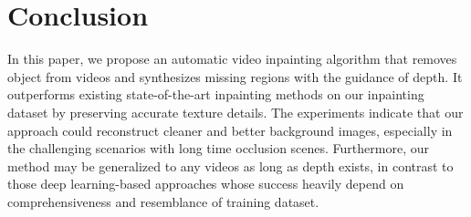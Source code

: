 \documentclass[runningheads]{llncs}
\begin{document}
%
 
\section{Conclusion}
In this paper, we propose an automatic video inpainting algorithm that removes object from videos and synthesizes missing regions with the guidance of depth. It outperforms existing state-of-the-art inpainting methods on our inpainting dataset by preserving accurate texture details. The experiments indicate that our approach could  reconstruct cleaner and better background images, especially in the challenging scenarios with long time occlusion scenes. Furthermore, our method may be generalized to any videos as long as depth exists, in contrast to those deep learning-based approaches whose success heavily depend on comprehensiveness and resemblance of training dataset. 





%
 

\clearpage


\end{document}
